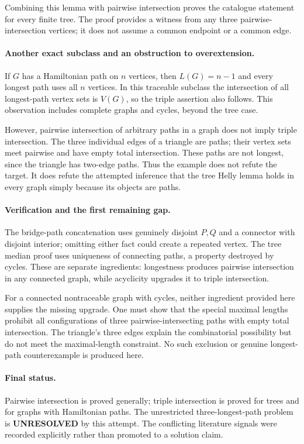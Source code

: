 \documentclass[11pt,a4paper]{article}
\begin{document}
Combining this lemma with pairwise intersection proves the catalogue statement for every finite tree. The proof provides a witness from any three pairwise-intersection vertices; it does not assume a common endpoint or a common edge.

\paragraph{Another exact subclass and an obstruction to overextension.}
If $G$ has a Hamiltonian path on $n$ vertices, then $L(G)=n-1$ and every longest path uses all $n$ vertices. In this traceable subclass the intersection of all longest-path vertex sets is $V(G)$, so the triple assertion also follows. This observation includes complete graphs and cycles, beyond the tree case.

However, pairwise intersection of arbitrary paths in a graph does not imply triple intersection. The three individual edges of a triangle are paths; their vertex sets meet pairwise and have empty total intersection. These paths are not longest, since the triangle has two-edge paths. Thus the example does not refute the target. It does refute the attempted inference that the tree Helly lemma holds in every graph simply because its objects are paths.

\paragraph{Verification and the first remaining gap.}
The bridge-path concatenation uses genuinely disjoint $P,Q$ and a connector with disjoint interior; omitting either fact could create a repeated vertex. The tree median proof uses uniqueness of connecting paths, a property destroyed by cycles. These are separate ingredients: longestness produces pairwise intersection in any connected graph, while acyclicity upgrades it to triple intersection.

For a connected nontraceable graph with cycles, neither ingredient provided here supplies the missing upgrade. One must show that the special maximal lengths prohibit all configurations of three pairwise-intersecting paths with empty total intersection. The triangle's three edges explain the combinatorial possibility but do not meet the maximal-length constraint. No such exclusion or genuine longest-path counterexample is produced here.

\paragraph{Final status.}
Pairwise intersection is proved generally; triple intersection is proved for trees and for graphs with Hamiltonian paths. The unrestricted three-longest-path problem is \textbf{UNRESOLVED} by this attempt. The conflicting literature signals were recorded explicitly rather than promoted to a solution claim.
\end{document}
